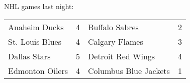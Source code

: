 NHL games last night:
\begin{tabular}{llll}
\toprule
  Anaheim Ducks & 4 &        Buffalo Sabres & 2 \\
St. Louis Blues & 4 &        Calgary Flames & 3 \\
   Dallas Stars & 5 &     Detroit Red Wings & 4 \\
Edmonton Oilers & 4 & Columbus Blue Jackets & 1 \\
\bottomrule
\end{tabular}
